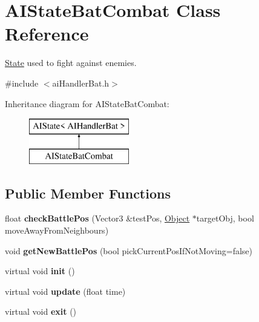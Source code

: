 \hypertarget{classAIStateBatCombat}{
\section{\-A\-I\-State\-Bat\-Combat \-Class \-Reference}
\label{df/d66/classAIStateBatCombat}
}


\hyperlink{classState}{\-State} used to fight against enemies.  




{\ttfamily \#include $<$ai\-Handler\-Bat.\-h$>$}

\-Inheritance diagram for \-A\-I\-State\-Bat\-Combat\-:\begin{figure}[H]
\begin{center}
\leavevmode
\includegraphics[height=2.000000cm]{df/d66/classAIStateBatCombat}
\end{center}
\end{figure}
\subsection*{\-Public \-Member \-Functions}
\begin{DoxyCompactItemize}
\item 
\hypertarget{classAIStateBatCombat_a2bc97f629ca07678b86e1cc7a3088e30}{
float {\bfseries check\-Battle\-Pos} (\-Vector3 \&test\-Pos, \hyperlink{classObject}{\-Object} $\ast$target\-Obj, bool move\-Away\-From\-Neighbours)}
\label{df/d66/classAIStateBatCombat_a2bc97f629ca07678b86e1cc7a3088e30}

\item 
\hypertarget{classAIStateBatCombat_a27f493d6a74cb2cf353f2a1d1d74ae2e}{
void {\bfseries get\-New\-Battle\-Pos} (bool pick\-Current\-Pos\-If\-Not\-Moving=false)}
\label{df/d66/classAIStateBatCombat_a27f493d6a74cb2cf353f2a1d1d74ae2e}

\item 
\hypertarget{classAIStateBatCombat_a6be5a217e7e3e3432929d07074bd4624}{
virtual void {\bfseries init} ()}
\label{df/d66/classAIStateBatCombat_a6be5a217e7e3e3432929d07074bd4624}

\item 
\hypertarget{classAIStateBatCombat_af189bd4338c1a37b4d894d23a9c2da1e}{
virtual void {\bfseries update} (float time)}
\label{df/d66/classAIStateBatCombat_af189bd4338c1a37b4d894d23a9c2da1e}

\item 
\hypertarget{classAIStateBatCombat_abab9f3a051b2bdf6af7364192688ad95}{
virtual void {\bfseries exit} ()}
\label{df/d66/classAIStateBatCombat_abab9f3a051b2bdf6af7364192688ad95}

\end{DoxyCompactItemize}
